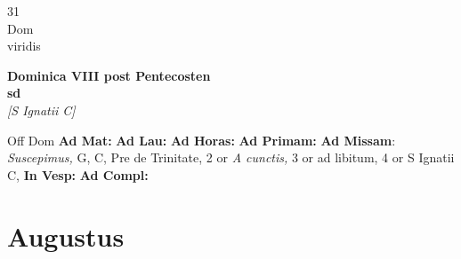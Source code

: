 \documentclass[10pt, openany]{book}
\begin{document}
        \begin{center}
            \begin{minipage}{3.5in}
                \vspace{2em}
                \begin{minipage}{0.5in}
                    {\Huge 31} \\
                    {\normalsize Dom} \\
                    {\normalsize viridis}
                \end{minipage}
                \begin{minipage}{3.0in}
                    \textbf{ \large Dominica VIII post Pentecosten \\
                    \textnormal{\normalsize sd}} \\ \textit{[S Ignatii C]} \\ 
                \end{minipage}
                \begin{justify}Off Dom
                    \textbf{Ad Mat: }
                    \textbf{Ad Lau: }
                    \textbf{Ad Horas: }
                    \textbf{Ad Primam: }\textbf{Ad Missam}: \textit{Suscepimus,} G, C, Pre de Trinitate, 2 or \textit{A cunctis,} 3 or ad libitum, 4 or S Ignatii C,  
                    \textbf{In Vesp: }
                    \textbf{Ad Compl: }
                \end{justify}
            \end{minipage}
        \end{center}
    
        \chapter{Augustus}
                        
\end{document}
